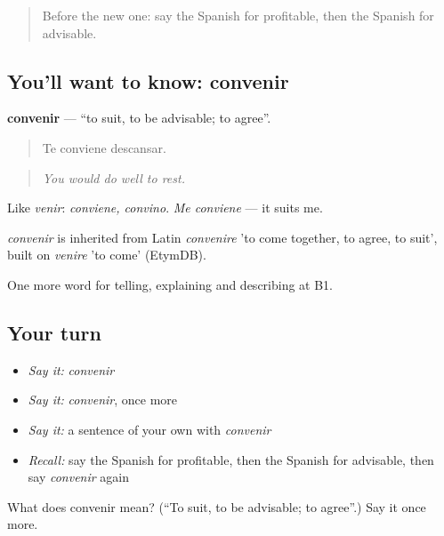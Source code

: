 \label{lesson:ES-C637-convenir}



\begin{quote}
Before the new one: say the Spanish for profitable, then the Spanish for advisable.
\end{quote}

\subsection*{You'll want to know: convenir}
\textbf{convenir} — \textquotedblleft{}to suit, to be advisable; to agree\textquotedblright{}.

\begin{quote}
Te conviene descansar.
\end{quote}

\begin{quote}
\emph{You would do well to rest.}
\end{quote}

Like \emph{venir}: \emph{conviene, convino}. \emph{Me conviene} — it suits me.

\begin{cousinweb}
\emph{convenir} is inherited from Latin \emph{convenire} 'to come together, to agree, to suit', built on \emph{venire} 'to come' (EtymDB).
\end{cousinweb}

\begin{grammarlens}[title={What you've built}]
One more word for telling, explaining and describing at B1.
\end{grammarlens}

\subsection*{Your turn}
\begin{itemize}
\raggedright
  \item \emph{Say it:} \emph{convenir}
  \item \emph{Say it:} \emph{convenir}, once more
  \item \emph{Say it:} a sentence of your own with \emph{convenir}
  \item \emph{Recall:} say the Spanish for profitable, then the Spanish for advisable, then say \emph{convenir} again
\end{itemize}

\begin{tcolorbox}[breakable,colback=teal!4,colframe=teal!35!black,title={Before you move on}]
What does convenir mean? (\textquotedblleft{}To suit, to be advisable; to agree\textquotedblright{}.) Say it once more.
\end{tcolorbox}
